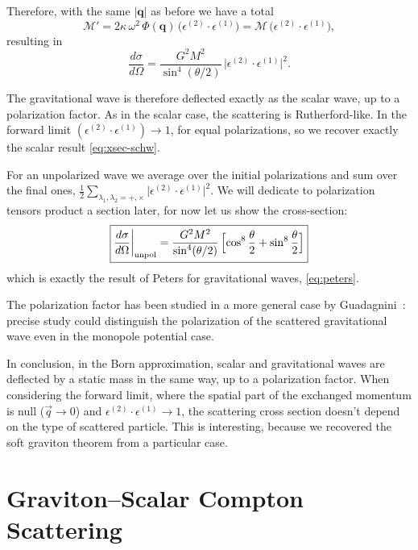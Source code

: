 \documentclass[12pt,a4paper,oneside]{article}
\numberwithin{equation}{section}   %
\begin{document}
Therefore, with the same $|\mathbf q|$ as before we have a total
\begin{equation}
  \label{eq:M-graviton}
  \mathcal M'=2\kappa\,\omega^2\,\Phi(\mathbf q)\,
  \bigl(\epsilon^{(2)}\!\cdot\epsilon^{(1)}\bigr)
  =\mathcal M\,\bigl(\epsilon^{(2)}\!\cdot\epsilon^{(1)}\bigr),
\end{equation}
resulting in 
\begin{equation}
    \label{eq:xsec-graviton}
    \boxed{
    \frac{d\sigma}{d\Omega}
    = \frac{G^2M^2}{\sin^{4}(\theta/2)}\,
    \bigl|\epsilon^{(2)}\!\cdot\epsilon^{(1)}\bigr|^2.
    }
\end{equation}

The gravitational wave is therefore deflected exactly as the scalar wave, up to
a polarization factor. As in the scalar case, the scattering is Rutherford-like.
In the forward limit $(\epsilon^{(2)}\!\cdot\epsilon^{(1)})\to1$, for equal
polarizations, so we recover exactly the scalar result \eqref{eq:xsec-schw}.

For an unpolarized wave we average over the initial polarizations and sum over
the final ones,
$\frac12\sum_{\lambda_1,\lambda_2=+,\times}
\bigl|\epsilon^{(2)}\!\cdot\epsilon^{(1)}\bigr|^2$.
We will dedicate to polarization tensors product a section later, for now
let us show the cross-section:
\begin{equation}
    \label{eq:xsec-graviton-unpol}
    \boxed{
    \frac{d\sigma}{d\Omega}\bigg|_{\text{unpol}}
    = \frac{G^2M^2}{\sin^{4}(\theta/2)}\,
    \Bigl[\cos^{8}\frac{\theta}{2}+\sin^{8}\frac{\theta}{2}\Bigr]
    }
\end{equation}
which is exactly the result of Peters for gravitational waves, \eqref{eq:peters}.

The polarization factor has been studied in a more general case by Guadagnini~\cite{Guadagnini2008}:
precise study could distinguish the polarization of the scattered gravitational
wave even in the monopole potential case. 

In conclusion, in the Born approximation, scalar and gravitational waves are
deflected by a static mass in the same way, up to a polarization factor.
When considering the forward limit, where the
 spatial part of the exchanged momentum is null ($\vec{q}\to0$) 
and $\epsilon^{(2)}\!\cdot\epsilon^{(1)}\to 1$,
the scattering cross section
doesn't depend on the type of scattered particle.
This is interesting, because we recovered
the soft graviton theorem from a particular 
case. 


\newpage
\section{Graviton--Scalar Compton Scattering}
\label{sec:compton}
\end{document}
